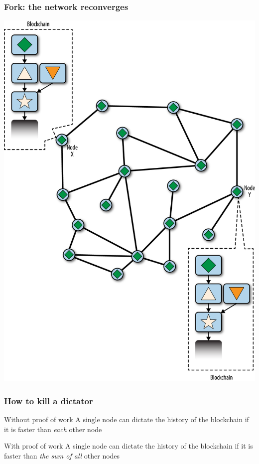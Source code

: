 \documentclass[11pt]{beamer}  %
\begin{document}
\begin{frame}\frametitle{Fork: the network reconverges}

  \begin{center}
    \includegraphics[scale=0.47,clip=false]{pictures/mbc2_1006.png}
  \end{center}

\end{frame}

\begin{frame}\frametitle{How to kill a dictator}

  \begin{greenbox}{Without proof of work}
    A single node can dictate the history of the blockchain
    if it is faster than \emph{each} other node
  \end{greenbox}

  \pause
  \bigskip
  \bigskip

  \begin{greenbox}{With proof of work}
    A single node can dictate the history of the blockchain
    if it is faster than \emph{the sum of all} other nodes
  \end{greenbox}

\end{frame}
\end{document}
